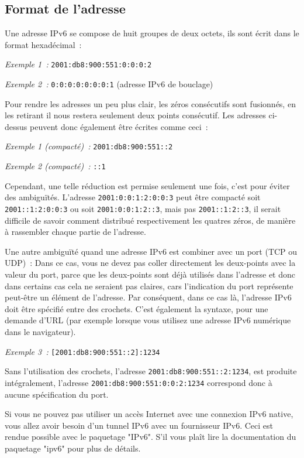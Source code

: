 \subsection{Format de l'adresse}

Une adresse IPv6 se compose de huit groupes de deux octets, ils sont écrit dans le format
hexadécimal~:

\emph{Exemple 1~:} \verb*?2001:db8:900:551:0:0:0:2?

\emph{Exemple 2~:} \verb*?0:0:0:0:0:0:0:1? (adresse IPv6 de bouclage)

Pour rendre les adresses un peu plus clair, les zéros consécutifs sont fusionnés, en les
retirant il nous restera seulement deux points consécutif. Les adresses ci-dessus peuvent
donc également être écrites comme ceci~:

\emph{Exemple 1 (compacté)~:} \verb*?2001:db8:900:551::2?

\emph{Exemple 2 (compacté)~:} \verb*?::1?

Cependant, une telle réduction est permise seulement une fois, c'est pour éviter des ambiguïtés.
L'adresse \verb*?2001:0:0:1:2:0:0:3? peut être compacté soit \verb*?2001::1:2:0:0:3? ou soit
\verb*?2001:0:0:1:2::3?, mais pas \verb*?2001::1:2::3?, il serait difficile de savoir comment
distribué respectivement les quatres zéros, de manière à rassembler chaque partie de l'adresse.

Une autre ambiguïté quand une adresse IPv6 est combiner avec un port (TCP ou UDP)~: Dans ce
cas, vous ne devez pas coller directement les deux-points avec la valeur du port, parce que
les deux-points sont déjà utilisés dans l'adresse et donc dans certains cas cela ne seraient
pas claires, cars l'indication du port représente peut-être un élément de l'adresse. Par conséquent,
dans ce cas là, l'adresse IPv6 doit être spécifié entre des crochets. C'est également la syntaxe,
pour une demande d'URL (par exemple lorsque vous utilisez une adresse IPv6 numérique dans
le navigateur).

\emph{Exemple 3~:} \verb*?[2001:db8:900:551::2]:1234?

Sans l'utilisation des crochets, l'adresse \verb*?2001:db8:900:551::2:1234?, est produite
intégralement, l'adresse \verb*?2001:db8:900:551:0:0:2:1234? correspond donc à aucune
spécification du port.

Si vous ne pouvez pas utiliser un accès Internet avec une connexion IPv6 native, vous allez
avoir besoin d'un tunnel IPv6 avec un fournisseur IPv6. Ceci est rendue possible avec le paquetage
"IPv6". S'il vous plaît lire la documentation du paquetage "ipv6" pour plus de détails.

